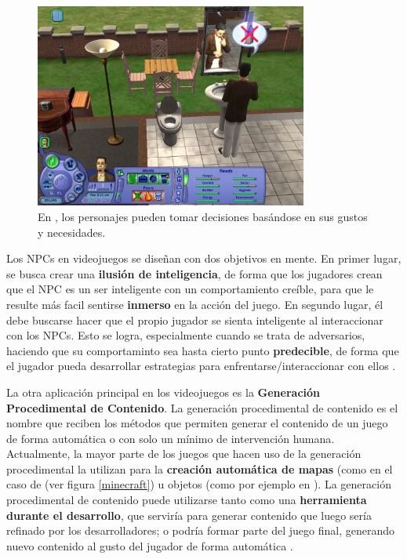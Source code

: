 \begin{figure}[h]
	\includegraphics[width=0.8\textwidth]{images/estadodelarte/ai/sims-captura}
	\centering
	\caption{En , los personajes pueden tomar decisiones basándose en sus gustos y necesidades.}
	\label{sims-captura}
\end{figure}

Los NPCs en videojuegos se diseñan con dos objetivos en mente. En primer lugar, se busca crear una \textbf{ilusión de inteligencia}, de forma que los jugadores crean que el NPC es un ser inteligente con un comportamiento creíble, para que le resulte más facil sentirse \textbf{inmerso} en la acción del juego. En segundo lugar, él debe buscarse hacer que el propio jugador se sienta inteligente al interaccionar con los NPCs. Esto se logra, especialmente cuando se trata de adversarios, haciendo que su comportaminto sea hasta cierto punto \textbf{predecible}, de forma que el jugador pueda desarrollar estrategias para enfrentarse/interaccionar con ellos \cite{ia_moderno}. 

La otra aplicación principal en los videojuegos es la \textbf{Generación Procedimental de Contenido}. La generación procedimental de contenido es el nombre que reciben los métodos que permiten generar el contenido de un juego de forma automática o con solo un mínimo de intervención humana. Actualmente, la mayor parte de los juegos que hacen uso de la generación procedimental la utilizan para la \textbf{creación automática de mapas} (como en el caso de  (ver figura \ref{minecraft}) u objetos (como por ejemplo en ). La generación procedimental de contenido puede utilizarse tanto como una \textbf{herramienta durante el desarrollo}, que serviría para generar contenido que luego sería refinado por los desarrolladores; o podría formar parte del juego final, generando nuevo contenido al gusto del jugador de forma automática \cite{ai_and_games}.

